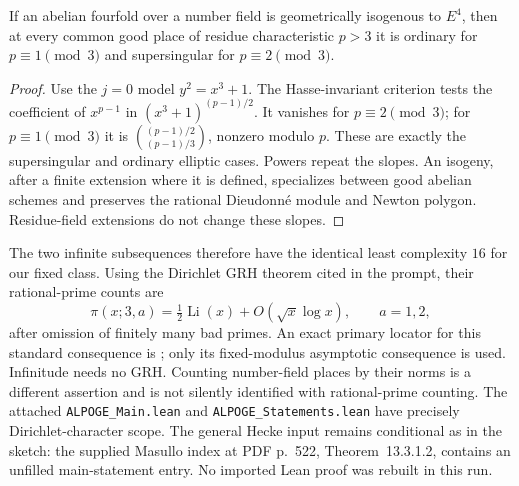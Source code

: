 \begin{proposition}
\label{prop:P02}
If an abelian fourfold over a number field is geometrically isogenous to $E^4$, then at every common good place of residue characteristic $p>3$ it is ordinary for $p\equiv1\pmod3$ and supersingular for $p\equiv2\pmod3$.
\end{proposition}
\begin{proof}
Use the $j=0$ model $y^2=x^3+1$.  The Hasse-invariant criterion \cite[Chapter V, Theorem 4.1(a)]{SilvermanAEC} tests the coefficient of $x^{p-1}$ in $(x^3+1)^{(p-1)/2}$.  It vanishes for $p\equiv2\pmod3$; for $p\equiv1\pmod3$ it is
$\binom{(p-1)/2}{(p-1)/3}$, nonzero modulo $p$.  These are exactly the supersingular and ordinary elliptic cases.  Powers repeat the slopes.  An isogeny, after a finite extension where it is defined, specializes between good abelian schemes and preserves the rational Dieudonn\'e module and Newton polygon.  Residue-field extensions do not change these slopes.
\end{proof}

The two infinite subsequences therefore have the identical least complexity $16$ for our fixed class.  Using the Dirichlet GRH theorem cited in the prompt, their rational-prime counts are
\[
 \pi(x;3,a)=\tfrac12\operatorname{Li}(x)+O(\sqrt{x}\log x),\qquad a=1,2,
\]
after omission of finitely many bad primes.  An exact primary locator for this standard consequence is \cite[Corollary 1.1, equation (2)]{Lee2023}; only its fixed-modulus asymptotic consequence is used.  Infinitude needs no GRH.  Counting number-field places by their norms is a different assertion and is not silently identified with rational-prime counting.
The attached \texttt{ALPOGE\_Main.lean} and \texttt{ALPOGE\_Statements.lean} have precisely Dirichlet-character scope.  The general Hecke input remains conditional as in the sketch: the supplied Masullo index at PDF p.~522, Theorem~13.3.1.2, contains an unfilled main-statement entry.  No imported Lean proof was rebuilt in this run.

